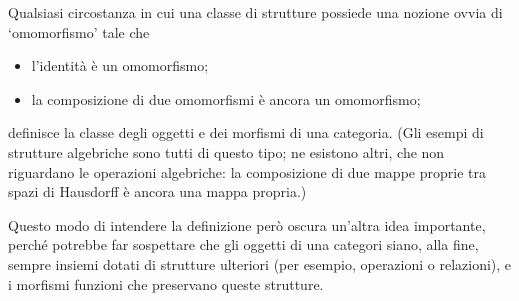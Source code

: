 Qualsiasi circostanza in cui una classe di strutture possiede una nozione ovvia di `omomorfismo' tale che
\begin{itemize}
	\item l'identità è un omomorfismo;
	\item la composizione di due omomorfismi è ancora un omomorfismo;
\end{itemize}
definisce la classe degli oggetti e dei morfismi di una categoria. (Gli esempi di strutture algebriche sono tutti di questo tipo; ne esistono altri, che non riguardano le operazioni algebriche: la composizione di due mappe proprie tra spazi di Hausdorff è ancora una mappa propria.)

Questo modo di intendere la definizione però oscura un'altra idea importante, perché potrebbe far sospettare che gli oggetti di una categori siano, alla fine, sempre insiemi dotati di strutture ulteriori (per esempio, operazioni o relazioni), e i morfismi funzioni che preservano queste strutture.

